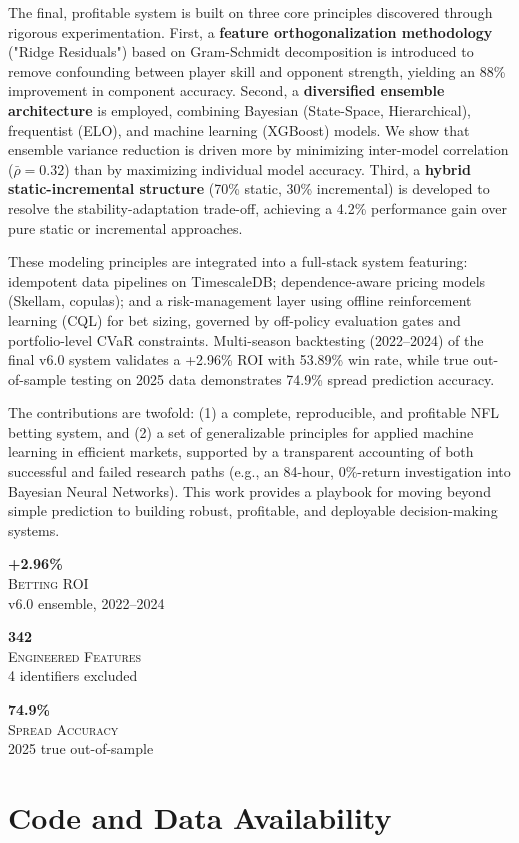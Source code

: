 \documentclass[12pt]{report}  %
\numberwithin{equation}{section}
\theoremstyle{plain}
\theoremstyle{definition}
\theoremstyle{remark}
\newcommand{\herometric}[3]{%
  \begin{minipage}[t]{0.30\textwidth}%
    \centering
    {\fontsize{28}{34}\selectfont\bfseries\color{accentBlue}#1}\\[4pt]
    {\small\textsc{#2}}\\[2pt]
    {\footnotesize\color{black!60}#3}
  \end{minipage}%
}
\newenvironment{herometricrow}{%
  \begin{center}
  \vspace{8pt}
  \begin{minipage}{0.92\textwidth}
  \centering
}{%
  \end{minipage}
  \vspace{8pt}
  \end{center}
}
\begin{document}
The final, profitable system is built on three core principles discovered through rigorous experimentation. First, a \textbf{feature orthogonalization methodology} ("Ridge Residuals") based on Gram-Schmidt decomposition is introduced to remove confounding between player skill and opponent strength, yielding an 88\% improvement in component accuracy. Second, a \textbf{diversified ensemble architecture} is employed, combining Bayesian (State-Space, Hierarchical), frequentist (ELO), and machine learning (XGBoost) models. We show that ensemble variance reduction is driven more by minimizing inter-model correlation ($\bar{\rho}=0.32$) than by maximizing individual model accuracy. Third, a \textbf{hybrid static-incremental structure} (70\% static, 30\% incremental) is developed to resolve the stability-adaptation trade-off, achieving a 4.2\% performance gain over pure static or incremental approaches.

These modeling principles are integrated into a full-stack system featuring: idempotent data pipelines on TimescaleDB; dependence-aware pricing models (Skellam, copulas); and a risk-management layer using offline reinforcement learning (CQL) for bet sizing, governed by off-policy evaluation gates and portfolio-level CVaR constraints. Multi-season backtesting (2022--2024) of the final v6.0 system validates a +2.96\% ROI with 53.89\% win rate, while true out-of-sample testing on 2025 data demonstrates 74.9\% spread prediction accuracy.

The contributions are twofold: (1) a complete, reproducible, and profitable NFL betting system, and (2) a set of generalizable principles for applied machine learning in efficient markets, supported by a transparent accounting of both successful and failed research paths (e.g., an 84-hour, 0\%-return investigation into Bayesian Neural Networks). This work provides a playbook for moving beyond simple prediction to building robust, profitable, and deployable decision-making systems.

\begin{herometricrow}
\herometric{+2.96\%}{Betting ROI}{v6.0 ensemble, 2022--2024}%
\hfill
\herometric{342}{Engineered Features}{4 identifiers excluded}%
\hfill
\herometric{74.9\%}{Spread Accuracy}{2025 true out-of-sample}
\end{herometricrow}

\chapter*{Code and Data Availability}
\end{document}
